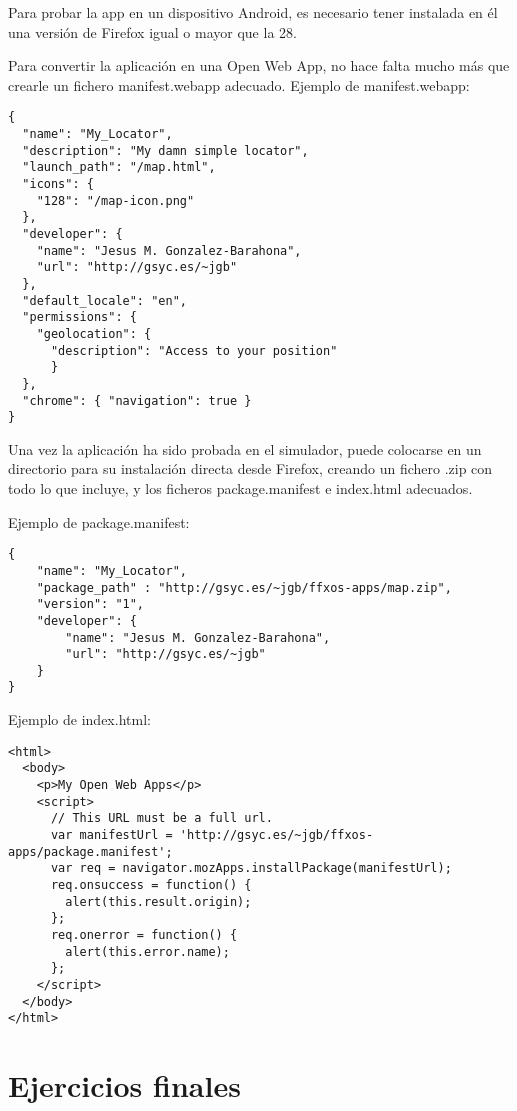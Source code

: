 Para probar la app en un dispositivo Android, es necesario tener instalada en él una versión de Firefox igual o mayor que la 28.

Para convertir la aplicación en una Open Web App, no hace falta mucho más que crearle un fichero manifest.webapp adecuado. Ejemplo de manifest.webapp:

\begin{verbatim}
{
  "name": "My_Locator",
  "description": "My damn simple locator",
  "launch_path": "/map.html",
  "icons": {
    "128": "/map-icon.png"
  },
  "developer": {
    "name": "Jesus M. Gonzalez-Barahona",
    "url": "http://gsyc.es/~jgb"
  },
  "default_locale": "en",
  "permissions": {
    "geolocation": {
      "description": "Access to your position"
      }
  },
  "chrome": { "navigation": true }
}
\end{verbatim}

Una vez la aplicación ha sido probada en el simulador, puede colocarse en un directorio para su instalación directa desde Firefox, creando un fichero .zip con todo lo que incluye, y los ficheros package.manifest e index.html adecuados.

Ejemplo de package.manifest:

\begin{verbatim}
{
    "name": "My_Locator",
    "package_path" : "http://gsyc.es/~jgb/ffxos-apps/map.zip",
    "version": "1",
    "developer": {
        "name": "Jesus M. Gonzalez-Barahona",
        "url": "http://gsyc.es/~jgb"
    }
}
\end{verbatim}

Ejemplo de index.html:

\begin{verbatim}
<html>
  <body>
    <p>My Open Web Apps</p>
    <script>
      // This URL must be a full url.
      var manifestUrl = 'http://gsyc.es/~jgb/ffxos-apps/package.manifest';
      var req = navigator.mozApps.installPackage(manifestUrl);
      req.onsuccess = function() {
        alert(this.result.origin);
      };
      req.onerror = function() {
        alert(this.error.name);
      };
    </script>
  </body>
</html>
\end{verbatim}


\section{Ejercicios finales}

